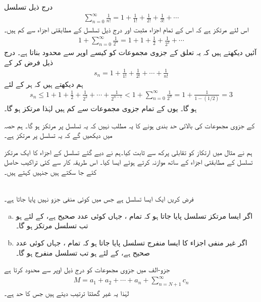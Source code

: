 درج ذیل تسلسل
\begin{align*}
\sum\limits_{n=0}^{\infty}\frac{1}{n!}=1+\frac{1}{1!}+\frac{1}{2!}+\frac{1}{3!}+\cdots
\end{align*}
 اس لئے مرتکز ہے کہ اس کے تمام اجزاء مثبت اور  درج ذیل تسلسل کے مطابقتی اجزاء سے کم ہیں۔
\begin{align*}
1+\sum_{n=0}^{\infty}\frac{1}{2^n}=1+1+\frac{1}{2}+\frac{1}{2^2}+\cdots
\end{align*}
آئیں دیکھتے ہیں کہ یہ تعلق   کے جزوی مجموعات کو کیسے اوپر سے محدود بناتا ہے۔ درج ذیل فرض کر کے
\begin{align*}
s_n=1+\frac{1}{1!}+\frac{1}{2!}+\cdots+\frac{1}{n!}
\end{align*}
ہم دیکھتے ہیں کہ ہر  کے لئے
\begin{align*}
s_n\le 1+1+\frac{1}{2}+\frac{1}{2^2}+\cdots+\frac{1}{2^{n-1}}<1+\sum_{n=0}^{\infty}\frac{1}{2^n}=1+\frac{1}{1-(1/2)}=3
\end{align*}
ہو گا۔ یوں  کے تمام جزوی مجموعات  سے کم ہیں لہٰذا  مرتکز ہو گا۔

 کے جزوی مجموعات کی بالائی حد بندی  ہونے کا یہ مطلب نہیں کہ یہ تسلسل  پر مرتکز ہو گا۔ ہم حصہ  میں دیکھیں گے کہ یہ تسلسل  پر مرتکز ہے۔ 

ہم نے مثال  میں ارتکاز کو تقابلی پرکھ سے ثابت کیا۔ہم نے دیے گئے تسلسل کے اجزاء کا ایک مرتکز تسلسل کے مطابقتی اجزاء کے ساتھ موازنہ کرتے ہوئے ایسا کیا۔ اس طریقہ کار سے کئی تراکیب حاصل کئے جا سکتے ہیں جنہیں  کہتے ہیں۔

\\
فرض کریں  ایک ایسا تسلسل ہے جس میں کوئی منفی جزو نہیں پایا جاتا ہے۔
\begin{enumerate}[a.]
\item
اگر ایسا مرتکز تسلسل  پایا جاتا ہو کہ  تمام ، جہاں  کوئی عدد صحیح ہے،  کے لئے  ہو تب تسلسل  مرتکز ہو گا۔
\item
اگر غیر منفی اجزاء کا ایسا منفرج تسلسل  پایا جاتا ہو کہ  تمام ، جہاں  کوئی عدد صحیح ہے،  کے لئے  ہو تب  تسلسل  منفرج ہو گا۔
\end{enumerate}
جزو-الف میں جزوی مجموعات  کو درج ذیل اوپر سے محدود کرتا ہے
\begin{align*}
M=a_1+a_2+\cdots+a_n+\sum_{n=N+1}^{\infty}c_n
\end{align*}
لہٰذا یہ غیر گھٹتا ترتیب دیتے ہیں جس کا حد  ہے۔


